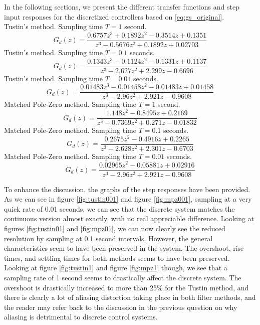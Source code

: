\documentclass[a4paper, 12pt]{article}
\begin{document}
In the following sections, we present the different transfer functions and step
input responses for the discretized controllers based on \eqref{eq:gs_original}.\\

\noindent Tustin's method. Sampling time $T = 1$ second.
\begin{equation}
  G_d(z) = \frac{0.6757 z^3 + 0.1892 z^2 - 0.3514 z + 0.1351}{z^3 - 0.5676 z^2 + 0.1892 z + 0.02703}
  \label{eq:tustin_1}
\end{equation}
\noindent Tustin's method. Sampling time $T = 0.1$ seconds.
\begin{equation}
  G_d(z) = \frac{0.1343 z^3 - 0.1124 z^2 - 0.1331 z + 0.1137}{z^3 - 2.627 z^2 + 2.299 z - 0.6696}
  \label{eq:tustin_01}
\end{equation}
\noindent Tustin's method. Sampling time $T = 0.01$ seconds.
\begin{equation}
  G_d(z) = \frac{0.01483 z^3 - 0.01458 z^2 - 0.01483 z + 0.01458}{z^3 - 2.96 z^2 + 2.921 z - 0.9608}
  \label{eq:tustin_001}
\end{equation}
\noindent Matched Pole-Zero method. Sampling time $T = 1$ second.
\begin{equation}
  G_d(z) = \frac{1.148 z^2 - 0.8495 z + 0.2169}{z^3 - 0.7369 z^2 + 0.271 z - 0.01832}
  \label{eq:mpz_1}
\end{equation}
\noindent Matched Pole-Zero method. Sampling time $T = 0.1$ seconds.
\begin{equation}
  G_d(z) = \frac{0.2675 z^2 - 0.4916 z + 0.2265}{z^3 - 2.628 z^2 + 2.301 z - 0.6703}
  \label{eq_mpz_01}
\end{equation}
\noindent Matched Pole-Zero method. Sampling time $T = 0.01$ seconds.
\begin{equation}
  G_d(z) = \frac{0.02965 z^2 - 0.05881 z + 0.02916}{z^3 - 2.96 z^2 + 2.921 z - 0.9608}
  \label{eq:mpz_001}
\end{equation}

To enhance the discussion, the graphs of the step responses have been provided.
As we can see in figure \ref{fig:tustin001} and figure \ref{fig:mpz001},
sampling at a very quick rate of 0.01 seconds, we can see that the discrete
system matches the continuous version almost exactly, with no real appreciable
difference. Looking at figures \ref{fig:tustin01} and \ref{fig:mpz01}, we can
now clearly see the reduced resolution by sampling at 0.1 second intervals.
However, the general characteristics seem to have been preserved in the system.
The overshoot, rise times, and settling times for both methods seems to have
been preserved. Looking at figure \ref{fig:tustin1} and figure \ref{fig:mpz1}
though, we see that a sampling rate of 1 second seems to drastically affect the
discrete system. The overshoot is drastically increased to more than 25\% for
the Tustin method, and there is clearly a lot of aliasing distortion taking
place in both filter methods, and the reader may refer back to the discussion
in the previous question on why aliasing is detrimental to discrete control
systems.
\end{document}

